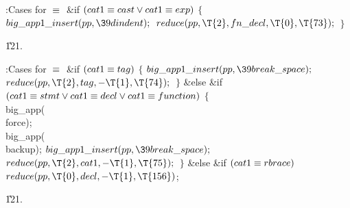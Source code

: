\B{}:Cases for \X${}\equiv{}$\6
\&{if} ${}(\\{cat1}\equiv\\{cast}\lor\\{cat1}\equiv\\{exp}){}$\5
${}\{{}$\1\6
${}\\{big\_app1\_insert}(\\{pp},\39\\{dindent});{}$\6
${}\\{reduce}(\\{pp},\39\T{2},\39\\{fn\_decl},\39\T{0},\39\T{73});{}$\6
\4${}\}{}$\2\par
\U121.\fi

\B{}:Cases for \X${}\equiv{}$\6
\&{if} ${}(\\{cat1}\equiv\\{tag}){}$\5
${}\{{}$\1\6
${}\\{big\_app1\_insert}(\\{pp},\39\\{break\_space});{}$\6
${}\\{reduce}(\\{pp},\39\T{2},\39\\{tag},\39{-}\T{1},\39\T{74});{}$\6
\4${}\}{}$\2\6
\&{else} \&{if} ${}(\\{cat1}\E\\{stmt}\V\\{cat1}\E\\{decl}\V\\{cat1}\E%
\\{function}){}$\5
${}\{{}$\1\6
\\{big\_app}(\\{force});\6
\\{big\_app}(\\{backup});\6
${}\\{big\_app1\_insert}(\\{pp},\39\\{break\_space});{}$\6
${}\\{reduce}(\\{pp},\39\T{2},\39\\{cat1},\39{-}\T{1},\39\T{75});{}$\6
\4${}\}{}$\2\6
\&{else} \&{if} ${}(\\{cat1}\equiv\\{rbrace}){}$\1\5
${}\\{reduce}(\\{pp},\39\T{0},\39\\{decl},\39{-}\T{1},\39\T{156}){}$;\2\par
\U121.\fi

